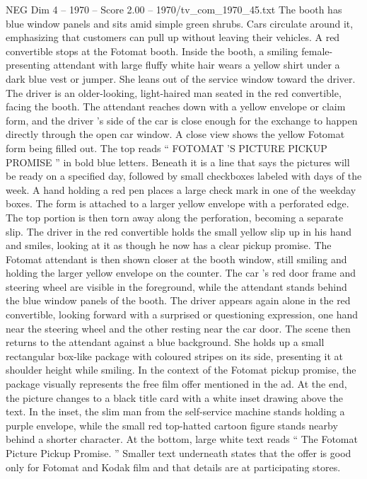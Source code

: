 \begin{textsample}{NEG Dim 4 – 1970 – Score 2.00 – 1970/tv\_com\_1970\_45.txt}
The booth has blue window panels and sits amid simple green shrubs.
Cars circulate around it, emphasizing that customers can pull up without leaving their vehicles.
A red convertible stops at the Fotomat booth.
Inside the booth, a smiling female-presenting attendant with large fluffy white hair wears a yellow shirt under a dark blue vest or jumper.
She leans out of the service window toward the driver.
The driver is an older-looking, light-haired man seated in the red convertible, facing the booth.
The attendant reaches down with a yellow envelope or claim form, and the driver ’s side of the car is close enough for the exchange to happen directly through the open car window.
A close view shows the yellow Fotomat form being filled out.
The top reads “ FOTOMAT ’S PICTURE PICKUP PROMISE ” in bold blue letters.
Beneath it is a line that says the pictures will be ready on a specified day, followed by small checkboxes labeled with days of the week.
A hand holding a red pen places a large check mark in one of the weekday boxes.
The form is attached to a larger yellow envelope with a perforated edge.
The top portion is then torn away along the perforation, becoming a separate slip.
The driver in the red convertible holds the small yellow slip up in his hand and smiles, looking at it as though he now has a clear pickup promise.
The Fotomat attendant is then shown closer at the booth window, still smiling and holding the larger yellow envelope on the counter.
The car ’s red door frame and steering wheel are visible in the foreground, while the attendant stands behind the blue window panels of the booth.
The driver appears again alone in the red convertible, looking forward with a surprised or questioning expression, one hand near the steering wheel and the other resting near the car door.
The scene then returns to the attendant against a blue background.
She holds up a small rectangular box-like package with coloured stripes on its side, presenting it at shoulder height while smiling.
In the context of the Fotomat pickup promise, the package visually represents the free film offer mentioned in the ad.
At the end, the picture changes to a black title card with a white inset drawing above the text.
In the inset, the slim man from the self-service machine stands holding a purple envelope, while the small red top-hatted cartoon figure stands nearby behind a shorter character.
At the bottom, large white text reads “ The Fotomat Picture Pickup Promise. ” Smaller text underneath states that the offer is good only for Fotomat and Kodak film and that details are at participating stores.

\end{textsample}
